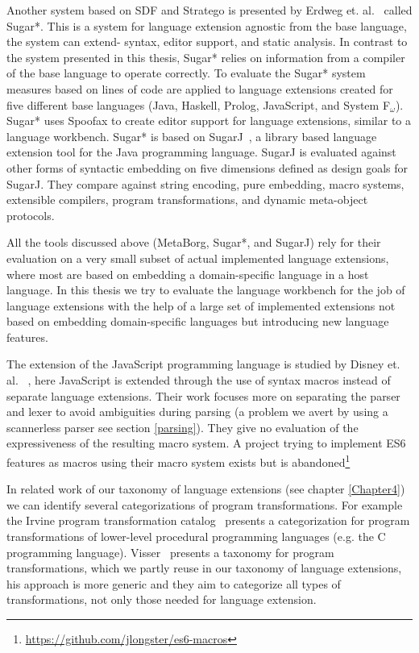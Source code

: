 Another system based on SDF and Stratego is presented by Erdweg et. al.~\cite{Erdweg} called Sugar*. This is a system for language extension agnostic from the base language, the system can extend- syntax, editor support, and static analysis. In contrast to the system presented in this thesis, Sugar* relies on information from a compiler of the base language to operate correctly. To evaluate the Sugar* system measures based on lines of code are applied to language extensions created for five different base languages (Java, Haskell, Prolog, JavaScript, and System F$_{\omega}$). Sugar* uses Spoofax to create editor support for language extensions, similar to a language workbench. Sugar* is based on SugarJ~\cite{Erdweg2011}, a library based language extension tool for the Java programming language. SugarJ is evaluated against other forms of syntactic embedding on five dimensions defined as design goals for SugarJ. They compare against string encoding, pure embedding, macro systems, extensible compilers, program transformations, and dynamic meta-object protocols.

All the tools discussed above (MetaBorg, Sugar*, and SugarJ) rely for their evaluation on a very small subset of actual implemented language extensions, where most are based on embedding a domain-specific language in a host language. In this thesis we try to evaluate the language workbench for the job of language extensions with the help of a large set of implemented extensions not based on embedding domain-specific languages but introducing new language features.  

The extension of the JavaScript programming language is studied by Disney et. al. ~\cite{Disney2014}, here JavaScript is extended through the use of syntax macros instead of separate language extensions. Their work focuses more on separating the parser and lexer to avoid ambiguities during parsing (a problem we avert by using a scannerless parser see section \ref{parsing}). They give no evaluation of the expressiveness of the resulting macro system. A project trying to implement ES6 features as macros using their macro system exists but is abandoned\footnote{\url{https://github.com/jlongster/es6-macros}}

In related work of our taxonomy of language extensions (see chapter \ref{Chapter4}) we can identify several categorizations of program transformations. For example the Irvine program transformation catalog~\cite{Standish1976a} presents a categorization for program transformations of lower-level procedural programming languages (e.g. the C programming language). Visser~\cite{Visser2001} presents a taxonomy for program transformations, which we partly reuse in our taxonomy of language extensions, his approach is more generic and they aim to categorize all types of transformations, not only those needed for language extension.

